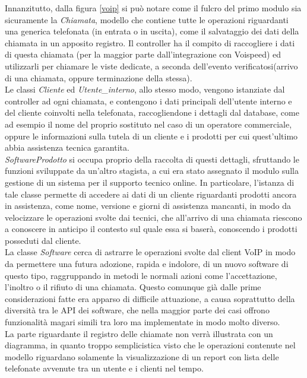 \noindent
Innanzitutto, dalla figura \ref{voip} si pu\`o notare come il fulcro del primo modulo sia sicuramente la \textit{Chiamata}, modello che contiene tutte le operazioni riguardanti una generica telefonata (in entrata o in uscita), come il salvataggio dei dati della chiamata in un apposito registro. Il controller ha il compito di raccogliere i dati di questa chiamata (per la maggior parte dall'integrazione con Voispeed) ed utilizzarli per chiamare le viste dedicate, a seconda dell'evento verificatosi(arrivo di una chiamata, oppure terminazione della stessa). \\
Le classi \textit{Cliente} ed \textit{Utente\_interno}, allo stesso modo, vengono istanziate dal controller ad ogni chiamata, e contengono i dati principali dell'utente interno e del cliente coinvolti nella telefonata, raccogliendone i dettagli dal database, come ad esempio il nome del proprio sostituto nel caso di un operatore commerciale, oppure le informazioni sulla tutela di un cliente e i prodotti per cui quest'ultimo abbia assistenza tecnica garantita. \\
\textit{SoftwareProdotto} si occupa proprio della raccolta di questi dettagli, sfruttando le funzioni sviluppate da un'altro stagista, a cui era stato assegnato il modulo sulla gestione di un sistema per il supporto tecnico online. In particolare, l'istanza di tale classe permette di accedere ai dati di un cliente riguardanti prodotti ancora in assistenza, come nome, versione e giorni di assistenza mancanti, in modo da velocizzare le operazioni svolte dai tecnici, che all'arrivo di una chiamata riescono a conoscere in anticipo il contesto sul quale essa si baser\`a, conoscendo i prodotti posseduti dal cliente. \\
La classe \textit{Software} cerca di astrarre le operazioni svolte dal client VoIP in modo da permettere una futura adozione, rapida e  indolore, di un nuovo software di questo tipo, raggruppando in metodi le normali azioni come l'accettazione, l'inoltro o il rifiuto di una chiamata. Questo comunque gi\`a dalle prime considerazioni fatte era apparso di difficile attuazione, a causa soprattutto della diversit\`a tra le API dei software, che nella maggior parte dei casi offrono funzionalit\`a magari simili tra loro ma implementate in modo molto diverso. \\
La parte riguardante il registro delle chiamate non verr\`a illustrata con un diagramma, in quanto troppo semplicistica visto che le operazioni contenute nel modello riguardano solamente la visualizzazione di un report con lista delle telefonate avvenute tra un utente e i clienti nel tempo.\\
